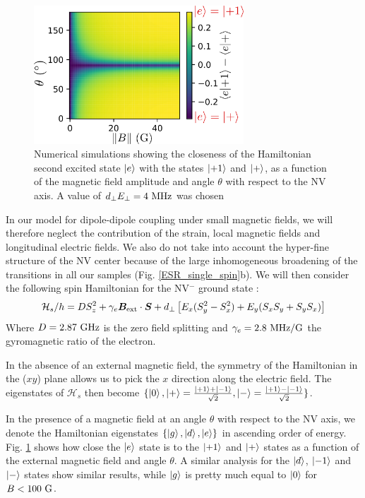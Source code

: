 \documentclass[preprintnumbers,amsmath,amssymb,onecolumn,12pt]{revtex4-2}\usepackage{graphicx}%
\begin{document}
\begin{figure}[h]
\includegraphics[width=0.7\textwidth]{Figures_SI/map_etats_propres}
\caption{Numerical simulations showing the closeness of the Hamiltonian second excited state $\ket{e}$ with the states $\ket{+1}$ and $\ket{+}$, as a function of the magnetic field amplitude and angle $\theta$ with respect to the NV axis. A value of $d_\perp E_\perp = 4\ \rm MHz$ was chosen}
\label{map etats propres}
\end{figure}

In our model for  dipole-dipole coupling under small magnetic fields, we will therefore neglect the contribution of the strain, local magnetic fields and longitudinal electric fields.  We also do not take into account the hyper-fine structure of the NV center because of the large inhomogeneous broadening of the transitions in all our samples (Fig. \ref{ESR_single_spin}b).
We will then consider the following spin Hamiltonian for the NV$^-$ ground state : 
\begin{equation}
\label{NV Hamiltonian}
\mathcal{H}_s/h=D S_z^2 + \gamma_e \bm{B}_{\rm ext} \cdot \bm{S}+ d_\perp \left[ E_x(S_y^2-S_x^2) + E_y(S_xS_y+S_yS_x) \right]
\end{equation}
Where $D=2.87\ \rm GHz$ is the zero field splitting and $\gamma_e=2.8\ \rm MHz/G$ the gyromagnetic ratio of the electron.

In the absence of an external magnetic field, the symmetry of the Hamiltonian in the ($xy$) plane allows us to pick the $x$ direction along the electric field. The eigenstates of $\mathcal{H}_s$ then become $\{ \ket{0},\ket{+}=\frac{\ket{+1}+\ket{-1}}{\sqrt{2}},\ket{-}=\frac{\ket{+1}-\ket{-1}}{\sqrt{2}} \} $.

In the presence of a magnetic field at an angle $\theta$ with respect to the NV axis, we denote the Hamiltonian eigenstates $\{ \ket{g},\ket{d}, \ket{e} \} $ in ascending order of energy. Fig. \ref{map etats propres} shows how close the $\ket{e}$ state is to the $\ket{+1}$ and $\ket{+}$ states as a function of the external magnetic field and angle $\theta$. A similar analysis for the  $\ket{d}$, $\ket{-1}$ and $\ket{-}$ states show similar results, while $\ket{g}$ is pretty much equal to $\ket{0}$ for $B<100\ \rm G$.
\end{document}
